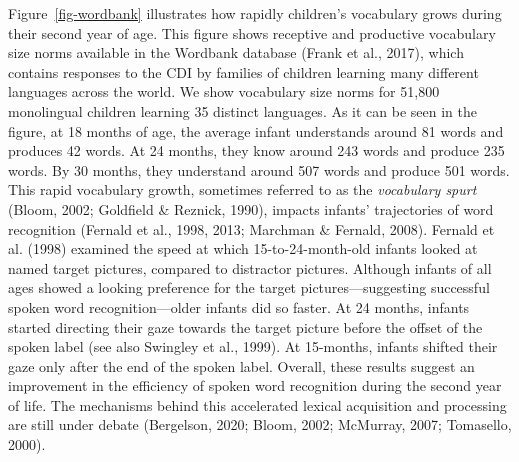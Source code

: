 \documentclass[
  12pt,
  b5paperpaper,
  twoside]{scrreprt}
\begin{document}
Figure~\ref{fig-wordbank} illustrates how rapidly children's vocabulary
grows during their second year of age. This figure shows receptive and
productive vocabulary size norms available in the Wordbank database
(Frank et al., 2017), which contains responses to the CDI by families of
children learning many different languages across the world. We show
vocabulary size norms for 51,800 monolingual children learning 35
distinct languages. As it can be seen in the figure, at 18 months of
age, the average infant understands around 81 words and produces 42
words. At 24 months, they know around 243 words and produce 235 words.
By 30 months, they understand around 507 words and produce 501 words.
This rapid vocabulary growth, sometimes referred to as the
\emph{vocabulary spurt} (Bloom, 2002; Goldfield \& Reznick, 1990),
impacts infants' trajectories of word recognition (Fernald et al., 1998,
2013; Marchman \& Fernald, 2008). Fernald et al. (1998) examined the
speed at which 15-to-24-month-old infants looked at named target
pictures, compared to distractor pictures. Although infants of all ages
showed a looking preference for the target pictures---suggesting
successful spoken word recognition---older infants did so faster. At 24
months, infants started directing their gaze towards the target picture
before the offset of the spoken label (see also Swingley et al., 1999).
At 15-months, infants shifted their gaze only after the end of the
spoken label. Overall, these results suggest an improvement in the
efficiency of spoken word recognition during the second year of life.
The mechanisms behind this accelerated lexical acquisition and
processing are still under debate (Bergelson, 2020; Bloom, 2002;
McMurray, 2007; Tomasello, 2000).
\end{document}

